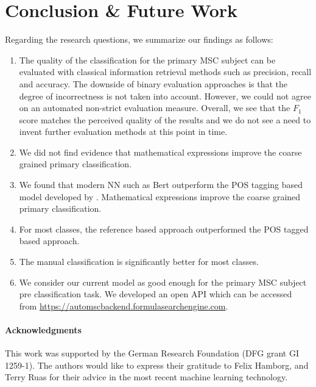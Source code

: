 \section{Conclusion \& Future Work}\label{sec.concl}
Regarding the research questions,
we summarize our findings as follows:
\begin{enumerate}
  \item The quality of the classification for the primary MSC subject can be evaluated with classical information retrieval methods such as precision, recall and accuracy.
  The downside of binary evaluation approaches is that the degree of incorrectness is not taken into account.
  However, we could not agree on an automated non-strict evaluation measure. Overall, we see that the $F_1$ score matches the perceived quality of the results and we do not see a need to invent further evaluation methods at this point in time.
  \item We did not find evidence that mathematical expressions improve the coarse grained primary classification.
  \item We found that modern NN such as Bert outperform the POS tagging based model developed by \cite{SchonebergS14}. Mathematical expressions improve the coarse grained primary classification.
  \item For most classes, the reference based approach outperformed the POS tagged based approach.
  \item The manual classification is significantly better for most classes. 
  \item We consider our current model as good enough for the primary MSC subject pre classification task. We developed an open API which can be accessed from \url{https://automscbackend.formulasearchengine.com}.
\end{enumerate}


\paragraph{Acknowledgments} This work was supported by the German Research Foundation (DFG grant GI 1259-1).
The authors would like to express their gratitude to Felix Hamborg, and Terry Ruas for their advice in the most recent machine learning technology.
\printbibliography[keyword=primary]
